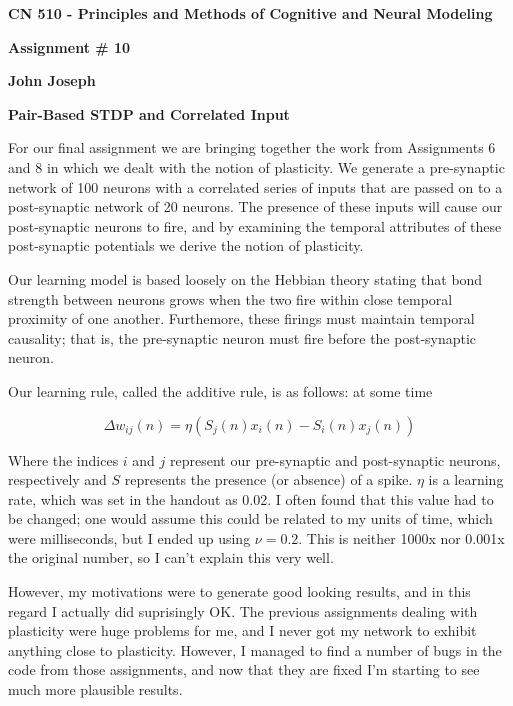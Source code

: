 \documentclass[a4paper,12pt]{article}
\begin{document}
\begin{center}

{\Large\bf CN 510 - Principles and Methods of Cognitive and Neural Modeling}

\bigskip

{\large\bf Assignment \# 10}
\smallskip

{\large\bf John Joseph}
\end{center}

\bigskip
{\bf Pair-Based STDP and Correlated Input}
\bigskip

For our final assignment we are bringing together the work from Assignments 6 and 8 in which we dealt with the notion of plasticity. We generate a pre-synaptic network of 100 neurons with a correlated series of inputs that are passed on to a post-synaptic network of 20 neurons. The presence of these inputs will cause our post-synaptic neurons to fire, and by examining the temporal attributes of these post-synaptic potentials we derive the notion of plasticity. 

\vspace{2mm}

Our learning model is based loosely on the Hebbian theory stating that bond strength between neurons grows when the two fire within close temporal proximity of one another. Furthemore, these firings must maintain temporal causality; that is, the pre-synaptic neuron must fire before the post-synaptic neuron. 

\vspace{2mm}

Our learning rule, called the additive rule, is as follows: at some time %

\begin{equation}
\Delta w_{ij}(n) = \eta (S_j(n)x_{i}(n)-S_i(n)x_j(n))
\end{equation}

Where the indices $i$ and $j$ represent our pre-synaptic and post-synaptic neurons, respectively and $S$ represents the presence (or absence) of a spike. $\eta$ is a learning rate, which was set in the handout as 0.02. I often found that this value had to be changed; one would assume this could be related to my units of time, which were milliseconds, but I ended up using $\nu=0.2$. This is neither 1000x nor 0.001x the original number, so I can't explain this very well. 

\vspace{2mm}

However, my motivations were to generate good looking results, and in this regard I actually did suprisingly OK. The previous assignments dealing with plasticity were huge problems for me, and I never got my network to exhibit anything close to plasticity. However, I managed to find a number of bugs in the code from those assignments, and now that they are fixed I'm starting to see much more plausible results. 
\end{document}
